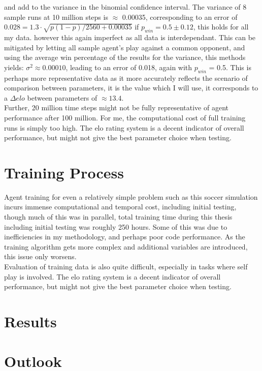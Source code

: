 \noindent
and add to the variance in the binomial confidence interval. The variance of 8 sample runs at 10 million steps is $\approx$ 0.00035, corresponding to an error of $0.028 = 1.3\cdot \sqrt{p(1-p)/2560 + 0.00035}$ if $p_{win} = 0.5 \pm 0.12$, this holds for all my data. however this again imperfect as all data is interdependant. This can be mitigated by letting all sample agent's play against a common opponent, and using the average win percentage of the results for the variance, this methods yields: $\sigma^2 \approx 0.00010$, leading to an error of 0.018, again with $p_{win}$ = 0.5. This is perhaps more representative data as it more accurately reflects the scenario of comparison between parameters, it is the value which I will use, it corresponds to a $\Delta elo$ between parameters of $\approx 13.4$. 
\\Further, 20 million time steps might not be fully representative of agent performance after 100 million. For me, the computational cost of full training runs is simply too high. The elo rating system is a decent indicator of overall performance, but might not give the best parameter choice when testing.

\section{Training Process}
 Agent training for even a relatively simple problem such as this soccer simulation incurs immense computational and temporal cost, including initial testing, though much of this was in parallel, total training time during this thesis including initial testing was roughly 250 hours. Some of this was due to inefficiencies in my methodology, and perhaps poor code performance. As the training algorithm gets more complex and additional variables are introduced, this issue only worsens. 
 \\ Evaluation of training data is also quite difficult, especially in tasks where self play is involved. The elo rating system is a decent indicator of overall performance, but might not give the best parameter choice when testing.
\section{Results}

\section{Outlook}